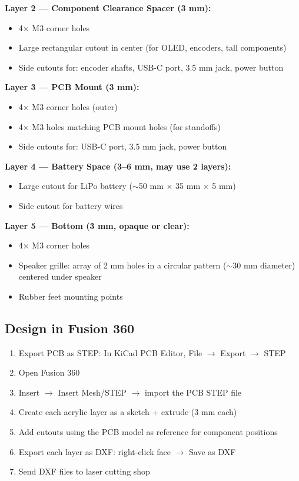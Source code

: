\documentclass[a4paper,11pt]{article}
\renewcommand*{\,}{ }%
\begin{document}
\textbf{Layer 2 --- Component Clearance Spacer (3\,mm):}
\begin{itemize}[noitemsep]
    \item 4$\times$ M3 corner holes
    \item Large rectangular cutout in center (for OLED, encoders, tall components)
    \item Side cutouts for: encoder shafts, USB-C port, 3.5\,mm jack, power button
\end{itemize}

\textbf{Layer 3 --- PCB Mount (3\,mm):}
\begin{itemize}[noitemsep]
    \item 4$\times$ M3 corner holes (outer)
    \item 4$\times$ M3 holes matching PCB mount holes (for standoffs)
    \item Side cutouts for: USB-C port, 3.5\,mm jack, power button
\end{itemize}

\textbf{Layer 4 --- Battery Space (3--6\,mm, may use 2 layers):}
\begin{itemize}[noitemsep]
    \item Large cutout for LiPo battery ($\sim$50\,mm $\times$ 35\,mm $\times$ 5\,mm)
    \item Side cutout for battery wires
\end{itemize}

\textbf{Layer 5 --- Bottom (3\,mm, opaque or clear):}
\begin{itemize}[noitemsep]
    \item 4$\times$ M3 corner holes
    \item Speaker grille: array of 2\,mm holes in a circular pattern ($\sim$30\,mm diameter) centered under speaker
    \item Rubber feet mounting points
\end{itemize}

\subsection{Design in Fusion 360}

\begin{enumerate}
    \item Export PCB as STEP: In KiCad PCB Editor, File $\rightarrow$ Export $\rightarrow$ STEP
    \item Open Fusion 360
    \item Insert $\rightarrow$ Insert Mesh/STEP $\rightarrow$ import the PCB STEP file
    \item Create each acrylic layer as a sketch + extrude (3\,mm each)
    \item Add cutouts using the PCB model as reference for component positions
    \item Export each layer as DXF: right-click face $\rightarrow$ Save as DXF
    \item Send DXF files to laser cutting shop
\end{enumerate}
\end{document}
